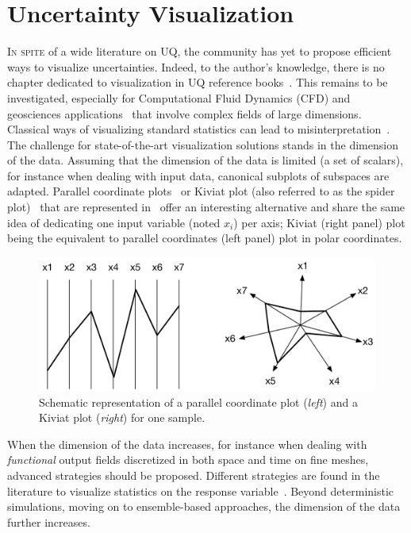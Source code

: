 \section{Uncertainty Visualization}\label{sec:visu}
\lettrine{I}{n spite} of a wide literature on UQ, the community has yet to propose efficient ways to visualize uncertainties. Indeed, to the author's knowledge, there is no chapter dedicated to visualization in UQ reference books~\citep{Saltelli2007,sullivan2015,handbookUQ}. This remains to be investigated, especially for Computational Fluid Dynamics (CFD) and geosciences applications~\citep{Moreland2016} that involve complex fields of large dimensions. Classical ways of visualizing standard statistics can lead to misinterpretation~\citep{Anscombe1973}. The challenge for state-of-the-art visualization solutions stands in the dimension of the data. Assuming that the dimension of the data is limited (a set of scalars), for instance when dealing with input data, canonical subplots of subspaces are adapted. Parallel coordinate plots~\citep{Inselberg1985} or Kiviat plot (also referred to as the spider plot)~\citep{Hackstadt1994} that are represented in~ offer an interesting alternative and share the same idea of dedicating one input variable (noted $x_i$) per axis; Kiviat (right panel) plot being the equivalent to parallel coordinates (left panel) plot in polar coordinates. 
\begin{figure}[!ht]
\centering
\includegraphics[width=0.9\linewidth,keepaspectratio]{fig/literature/parallel-kiviat.pdf}
\caption{Schematic representation of a parallel coordinate plot (\emph{left}) and a Kiviat plot (\emph{right}) for one sample.}
\label{fig:sketch_Kiviat-parallel}
\end{figure}

When the dimension of the data increases, for instance when dealing with \emph{functional} output fields discretized in both space and time on fine meshes, advanced strategies should be proposed. Different strategies are found in the literature to visualize statistics on the response variable~\citep{Potter2012a,Brodlie2012,Bonneau2014}. Beyond deterministic simulations, moving on to ensemble-based approaches, the dimension of the data further increases.


